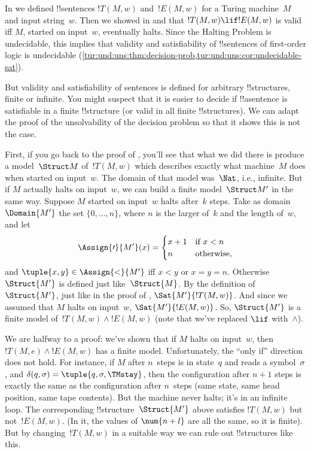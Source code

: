 \documentclass[../../../include/open-logic-section]{subfiles}
\begin{document}

\begin{explain}
  In  we defined !!{sentence}s $!T(M,w)$ and~$!E(M,w)$
  for a Turing machine~$M$ and input string~$w$. Then we showed in
   and 
  that $!T(M,w) \lif !E(M,w)$ is valid iff $M$, started on input~$w$,
  eventually halts. Since the Halting Problem is undecidable, this
  implies that validity and satisfiability of !!{sentence}s of
  first-order logic is undecidable
  (\cref{tur:und:uns:thm:decision-prob,tur:und:uns:cor:undecidable-sat}).

  But validity and satisfiability of sentences is defined for
  arbitrary !!{structure}s, finite or infinite. You might suspect that
  it is easier to decide if !!a{sentence} is satisfiable in a finite
  !!{structure} (or valid in all finite !!{structure}s). We can adapt
  the proof of the unsolvability of the decision problem so that it
  shows this is not the case.

  First, if you go back to the proof of
  , you'll see that what we did there is
  produce a model~$\Struct M$ of~$!T(M,w)$ which describes exactly
  what machine~$M$ does when started on input~$w$.  The domain of that
  model was~$\Nat$, i.e., infinite. But if $M$ actually halts on
  input~$w$, we can build a finite model~$\Struct M'$ in the same way.
  Suppose $M$ started on input~$w$ halts after~$k$ steps. Take as
  domain~$\Domain{M'}$ the set $\{0, \dots, n\}$, where $n$ is the
  larger of~$k$ and the length of~$w$, and let
  \[
    \Assign{\prime}{M'}(x) = 
    \begin{cases}
      x + 1 &\text{if $x < n$}\\
      n &\text{otherwise,}
    \end{cases}
  \]
  and $\tuple{x,y} \in \Assign{<}{M'}$ iff $x < y$ or $x = y = n$.
  Otherwise $\Struct{M'}$ is defined just like~$\Struct{M}$. By the
  definition of~$\Struct{M'}$, just like in the proof of
  , $\Sat{M'}{!T(M,w)}$.  And since we
  assumed that $M$ halts on input~$w$, $\Sat{M'}{!E(M,w)}$. So,
  $\Struct{M'}$ is a finite model of~$!T(M,w) \land !E(M,w)$ (note
  that we've replaced $\lif$ with~$\land$).
  
  We are halfway to a proof: we've shown that
  if $M$ halts on input~$w$, then $!T(M,e) \land !E(M,w)$ has a finite
  model. Unfortunately, the ``only if'' direction does not hold.  For
  instance, if $M$ after $n$~steps is in state~$q$ and reads a
  symbol~$\sigma$, and $\delta(q,\sigma) = \tuple{q,\sigma,\TMstay}$,
  then the configuration after $n+1$ steps is exactly the same as the
  configuration after $n$~steps (same state, same head position, same
  tape contents). But the machine never halts; it's in an infinite
  loop.  The corresponding !!{structure}~$\Struct{M'}$ above satisfies
  $!T(M,w)$ but not~$!E(M,w)$. (In it, the values of $\num{n+l}$ are
  all the same, so it is finite). But by changing~$!T(M,w)$ in a
  suitable way we can rule out !!{structure}s like this.
\end{explain}
\end{document}
